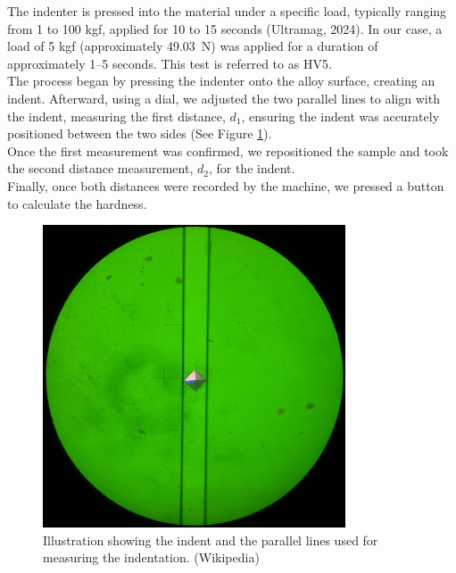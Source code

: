 \documentclass{article}
\begin{document}
\vspace{7pt}
\begin{minipage}{0.55\textwidth}
    The indenter is pressed into the material under a specific load, typically ranging from 1 to 100 kgf\footnotemark, applied for 10 to 15 seconds (Ultramag, 2024). In our case, a load of 5 kgf (approximately \SI{49.03}{\newton}) was applied for a duration of approximately 1–5 seconds. This test is referred to as HV5.\\[8pt]
    The process began by pressing the indenter onto the alloy surface, creating an indent. Afterward, using a dial, we adjusted the two parallel lines to align with the indent, measuring the first distance, \(d_1\), ensuring the indent was accurately positioned between the two sides (See Figure \ref{fig:vickers}). \\[8pt]  
    Once the first measurement was confirmed, we repositioned the sample and took the second distance measurement, \(d_2\), for the indent.\\[8pt]
    Finally, once both distances were recorded by the machine, we pressed a button to calculate the hardness.
\end{minipage}\hspace{1em}
\begin{minipage}{0.4\textwidth}\centering
\begin{figure}[H]
    \centering
    \includegraphics[width=0.8\textwidth]{images/1024px-Vicker_Hardness_-_Diamond_Indentation.jpg}
    \caption{Illustration showing the indent and the parallel lines used for measuring the indentation. (Wikipedia)}
    \label{fig:vickers}
\end{figure}
\end{minipage}\\
\end{document}
